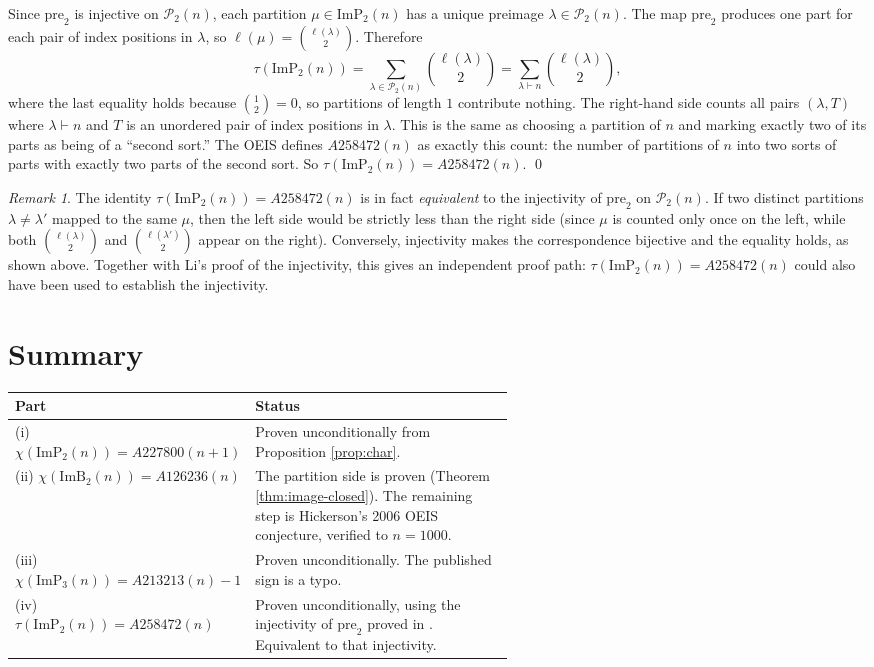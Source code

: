 \documentclass[11pt]{article}
\theoremstyle{remark}
\newtheorem{remark}[theorem]{Remark}
\begin{document}
Since $\mathrm{pre}_2$ is injective on $\mathcal{P}_2(n)$, each partition $\mu \in \mathrm{ImP}_2(n)$ has a unique preimage $\lambda \in \mathcal{P}_2(n)$. The map $\mathrm{pre}_2$ produces one part for each pair of index positions in $\lambda$, so $\ell(\mu) = \binom{\ell(\lambda)}{2}$. Therefore
\[
\tau(\mathrm{ImP}_2(n)) = \sum_{\lambda \in \mathcal{P}_2(n)} \binom{\ell(\lambda)}{2} = \sum_{\lambda \vdash n} \binom{\ell(\lambda)}{2},
\]
where the last equality holds because $\binom{1}{2} = 0$, so partitions of length $1$ contribute nothing. The right-hand side counts all pairs $(\lambda, T)$ where $\lambda \vdash n$ and $T$ is an unordered pair of index positions in $\lambda$. This is the same as choosing a partition of $n$ and marking exactly two of its parts as being of a ``second sort.'' The OEIS defines $A258472(n)$ as exactly this count: the number of partitions of $n$ into two sorts of parts with exactly two parts of the second sort. So $\tau(\mathrm{ImP}_2(n)) = A258472(n)$. \qed

\begin{remark}
The identity $\tau(\mathrm{ImP}_2(n)) = A258472(n)$ is in fact \emph{equivalent} to the injectivity of $\mathrm{pre}_2$ on $\mathcal{P}_2(n)$. If two distinct partitions $\lambda \neq \lambda'$ mapped to the same $\mu$, then the left side would be strictly less than the right side (since $\mu$ is counted only once on the left, while both $\binom{\ell(\lambda)}{2}$ and $\binom{\ell(\lambda')}{2}$ appear on the right). Conversely, injectivity makes the correspondence bijective and the equality holds, as shown above. Together with Li's proof \cite{Li} of the injectivity, this gives an independent proof path: $\tau(\mathrm{ImP}_2(n)) = A258472(n)$ could also have been used to establish the injectivity.
\end{remark}

\section{Summary}

\begin{center}
\renewcommand{\arraystretch}{1.4}
\begin{tabular}{|l|p{0.58\linewidth}|}
\hline
Part & Status \\
\hline
(i) $\chi(\mathrm{ImP}_2(n)) = A227800(n+1)$ & Proven unconditionally from Proposition \ref{prop:char}. \\
(ii) $\chi(\mathrm{ImB}_2(n)) = A126236(n)$ & The partition side is proven (Theorem \ref{thm:image-closed}). The remaining step is Hickerson's 2006 OEIS conjecture, verified to $n = 1000$. \\
(iii) $\chi(\mathrm{ImP}_3(n)) = A213213(n) - 1$ & Proven unconditionally. The published sign is a typo. \\
(iv) $\tau(\mathrm{ImP}_2(n)) = A258472(n)$ & Proven unconditionally, using the injectivity of $\mathrm{pre}_2$ proved in \cite{Li}. Equivalent to that injectivity. \\
\hline
\end{tabular}
\end{center}
\end{document}
